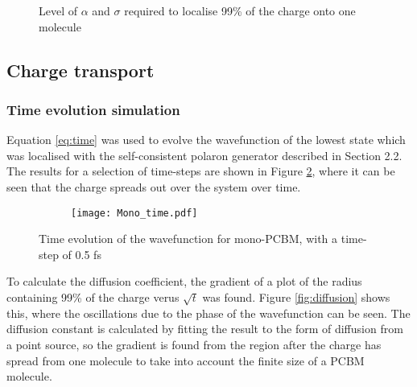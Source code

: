 \documentclass[a4paper,12pt]{article}
\begin{document}
\begin{figure}[H]
\centering
{}
\caption{Level of $\alpha$ and $\sigma$ required to localise 99\% of the charge onto one molecule}
\label{fig:alphadis}
\end{figure}


\subsection{Charge transport}

\subsubsection{Time evolution simulation}

Equation \ref{eq:time} was used to evolve the wavefunction of the lowest state which was localised with the self-consistent polaron generator described in Section 2.2. The results for a selection of time-steps are shown in Figure \ref{fig:time}, where it can be seen that the charge spreads out over the system over time.  

\begin{figure}[H]
\centering
\begin{subfigure}[b]{0.7\textwidth}
\texttt{[image: Mono\_time.pdf]}
\end{subfigure}
\caption{Time evolution of the wavefunction for mono-PCBM, with a time-step of  0.5 fs}
\label{fig:time}
\end{figure}

\noindent To calculate the diffusion coefficient, the gradient of a plot of the radius containing 99\% of the charge verus $\sqrt{t}$ was found. Figure \ref{fig:diffusion} shows this, where the oscillations due to the phase of the wavefunction can be seen. The diffusion constant is calculated by fitting the result to the form of diffusion from a point source, so the gradient is found from the region after the charge has spread from one molecule to take into account the finite size of a PCBM molecule. 
\end{document}
